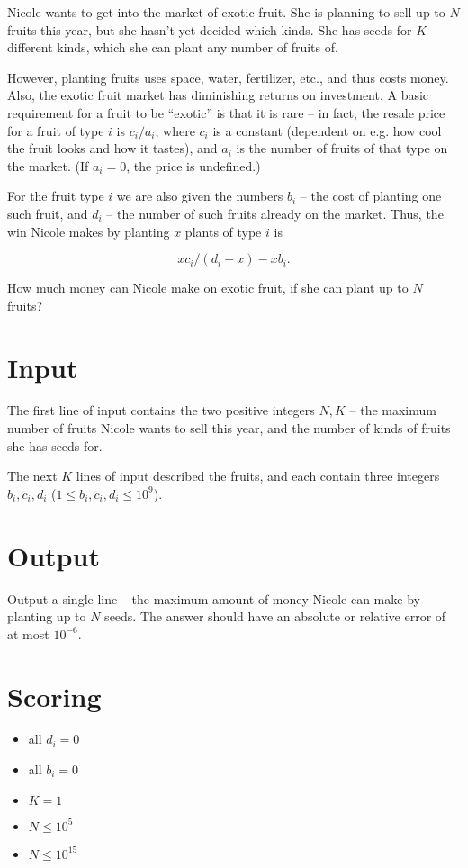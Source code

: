 Nicole wants to get into the market of exotic fruit.
She is planning to sell up to $N$ fruits this year, but she hasn't yet decided which kinds.
She has seeds for $K$ different kinds, which she can plant any number of fruits of.

However, planting fruits uses space, water, fertilizer, etc., and thus costs money.
Also, the exotic fruit market has diminishing returns on investment.
A basic requirement for a fruit to be ``exotic'' is that it is rare -- in fact, the
resale price for a fruit of type $i$ is $c_i / a_i$, where $c_i$ is a constant
(dependent on e.g. how cool the fruit looks and how it tastes), and $a_i$ is the number
of fruits of that type on the market. (If $a_i = 0$, the price is undefined.)

For the fruit type $i$ we are also given the numbers $b_i$ -- the cost of planting one
such fruit, and $d_i$ -- the number of such fruits already on the market.
Thus, the win Nicole makes by planting $x$ plants of type $i$ is

\[ x c_i / (d_i + x) - x b_i. \]

How much money can Nicole make on exotic fruit, if she can plant up to $N$ fruits?

\section*{Input}
The first line of input contains the two positive integers $N, K$ -- the maximum number of fruits
Nicole wants to sell this year, and the number of kinds of fruits she has seeds for.

The next $K$ lines of input described the fruits, and each contain three integers $b_i, c_i, d_i$ ($1 \le b_i, c_i, d_i \le 10^9$).

\section*{Output}
Output a single line -- the maximum amount of money Nicole can make by planting up to $N$ seeds.
The answer should have an absolute or relative error of at most $10^{-6}$.

\section*{Scoring}
\begin{itemize}
  \item all $d_i = 0$
  \item all $b_i = 0$
  \item $K = 1$
  \item $N \le 10^5$
  \item $N \le 10^{15}$
\end{itemize}
